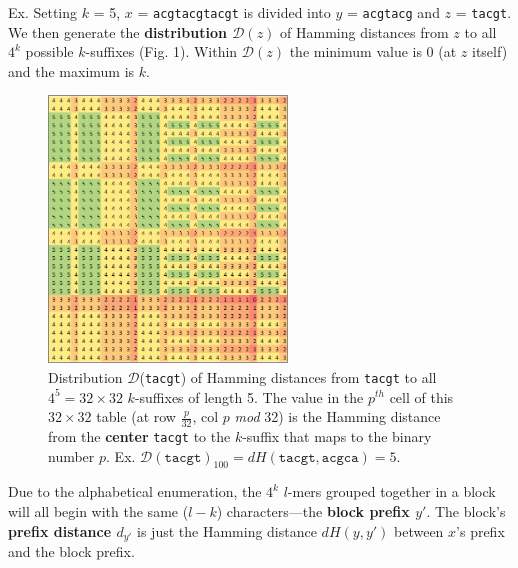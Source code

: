 \documentclass{acm_proc_article-sp}
\begin{document}
\begin{enumerate}
				{\small 
					Ex. Setting $k$ = 5, $x$ = \texttt{acgtacgtacgt}\newline
					\hspace*{18pt}is divided into $y$ = \texttt{acgtacg} and $z$ = \texttt{tacgt}.}\newline\newline
			We then generate the {\boldmath\bf distribution $\mathcal{D}(z)$} of Hamming distances from $z$ to all $4^{k}$ possible $k$-suffixes (Fig. 1). Within $\mathcal{D}(z)$ the minimum value is 0 (at $z$ itself) and the maximum is $k$.%
			\begin{figure}[h]
				\centering
				\label{fig:distribution}
				\includegraphics[width=2.5in]{img/D(tacgt)}
				\caption{\small
					Distribution $\mathcal{D}$(\texttt{tacgt}) of Hamming distances from \texttt{tacgt} 
					to all $4^{5} = 32\times32$ $k$-suffixes of length 5.
					The value in the $p^{th}$ cell of this $32\times32$ table (at row $\frac{p}{32}$, col $p$ \emph{mod} 32) is the Hamming distance from the \textbf{center} \texttt{tacgt} to the $k$-suffix that maps to the binary number $p$.\newline
					Ex. $\mathcal{D}(\texttt{tacgt})_{100} = dH(\texttt{tacgt}, \texttt{acgca}) = 5$.\newline
				}
				\end{figure}\newline
			Due to the alphabetical enumeration, the $4^{k}$ $l$-mers grouped together in a block will all begin with the same ($l-k$) characters---the {\boldmath\bf block prefix $y'$}. The block's {\boldmath\bf prefix distance $d_{y'}$} is just the Hamming distance $dH(y,y')$ between $x$'s prefix and the block prefix.\newline\newline

\end{enumerate}
\end{document}
